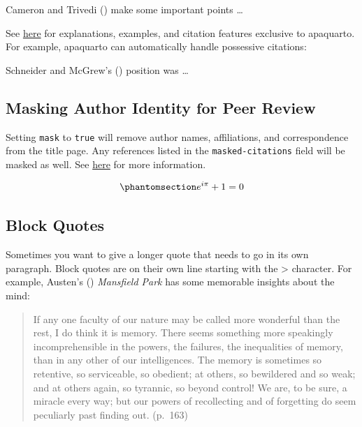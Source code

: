 \documentclass[
  jou,
  floatsintext,
  longtable,
  nolmodern,
  notxfonts,
  notimes,
  colorlinks=true,linkcolor=blue,citecolor=blue,urlcolor=blue]{apa7}
\begin{document}
Cameron and Trivedi () make some
important points \ldots{}

See
\href{https://wjschne.github.io/apaquarto/writing.html\#references}{here}
for explanations, examples, and citation features exclusive to
apaquarto. For example, apaquarto can automatically handle possessive
citations:

Schneider and McGrew's ()
position was \ldots{}

\subsection{Masking Author Identity for Peer
Review}\label{masking-author-identity-for-peer-review}

Setting \texttt{mask} to \texttt{true} will remove author names,
affiliations, and correspondence from the title page. Any references
listed in the \texttt{masked-citations} field will be masked as well.
See
\href{https://wjschne.github.io/apaquarto/writing.html\#masked-citations-for-anonymous-peer-review}{here}
for more information.

\begin{equation}\phantomsection\label{eq-euler}{
e^{i\pi}+1=0
}\end{equation}

\subsection{Block Quotes}\label{block-quotes}

Sometimes you want to give a longer quote that needs to go in its own
paragraph. Block quotes are on their own line starting with the
\textgreater{} character. For example, Austen's
() \emph{Mansfield
Park} has some memorable insights about the mind:

\begin{quote}
If any one faculty of our nature may be called more wonderful than the
rest, I do think it is memory. There seems something more speakingly
incomprehensible in the powers, the failures, the inequalities of
memory, than in any other of our intelligences. The memory is sometimes
so retentive, so serviceable, so obedient; at others, so bewildered and
so weak; and at others again, so tyrannic, so beyond control! We are, to
be sure, a miracle every way; but our powers of recollecting and of
forgetting do seem peculiarly past finding out. (p.~163)
\end{quote}
\end{document}
